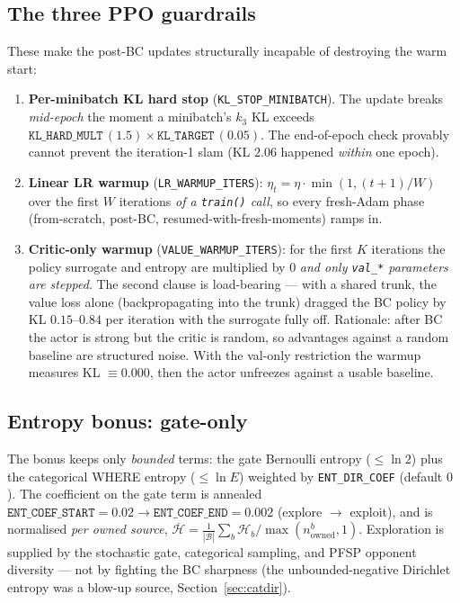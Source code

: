 \documentclass[11pt]{article}
\newcommand{\cd}[1]{\texttt{#1}}
\begin{document}
\subsection{The three PPO guardrails}\label{sec:guard}
These make the post-BC updates structurally incapable of destroying the warm start:
\begin{enumerate}[nosep,leftmargin=1.8em]
\item \textbf{Per-minibatch KL hard stop} (\cd{KL\_STOP\_MINIBATCH}). The update breaks \emph{mid-epoch}
  the moment a minibatch's $k_3$ KL exceeds $\cd{KL\_HARD\_MULT}\,(1.5)\times\cd{KL\_TARGET}\,(0.05)$. The
  end-of-epoch check provably cannot prevent the iteration-1 slam (KL $2.06$ happened \emph{within} one
  epoch).
\item \textbf{Linear LR warmup} (\cd{LR\_WARMUP\_ITERS}): $\eta_t=\eta\cdot\min(1,(t{+}1)/W)$ over the
  first $W$ iterations \emph{of a \cd{train()} call}, so every fresh-Adam phase (from-scratch, post-BC,
  resumed-with-fresh-moments) ramps in.
\item \textbf{Critic-only warmup} (\cd{VALUE\_WARMUP\_ITERS}): for the first $K$ iterations the policy
  surrogate and entropy are multiplied by $0$ \emph{and only \cd{val\_*} parameters are stepped}. The
  second clause is load-bearing --- with a shared trunk, the value loss alone (backpropagating into the
  trunk) dragged the BC policy by KL $0.15$--$0.84$ per iteration with the surrogate fully off. Rationale:
  after BC the actor is strong but the critic is random, so advantages against a random baseline are
  structured noise. With the val-only restriction the warmup measures KL $\equiv0.000$, then the actor
  unfreezes against a usable baseline.
\end{enumerate}

\subsection{Entropy bonus: gate-only}
The bonus keeps only \emph{bounded} terms: the gate Bernoulli entropy ($\le\ln2$) plus the categorical
WHERE entropy ($\le\ln E$) weighted by \cd{ENT\_DIR\_COEF} (default $0$). The coefficient on the gate
term is annealed $\cd{ENT\_COEF\_START}=0.02\to\cd{ENT\_COEF\_END}=0.002$ (explore $\to$ exploit), and is
normalised \emph{per owned source}, $\overline{\mathcal H}=\frac1{|\mathcal B|}\sum_b\mathcal H_b/\max(n^b_{\mathrm{owned}},1)$.
Exploration is supplied by the stochastic gate, categorical sampling, and PFSP opponent diversity --- not
by fighting the BC sharpness (the unbounded-negative Dirichlet entropy was a blow-up source,
Section~\ref{sec:catdir}).
\end{document}
